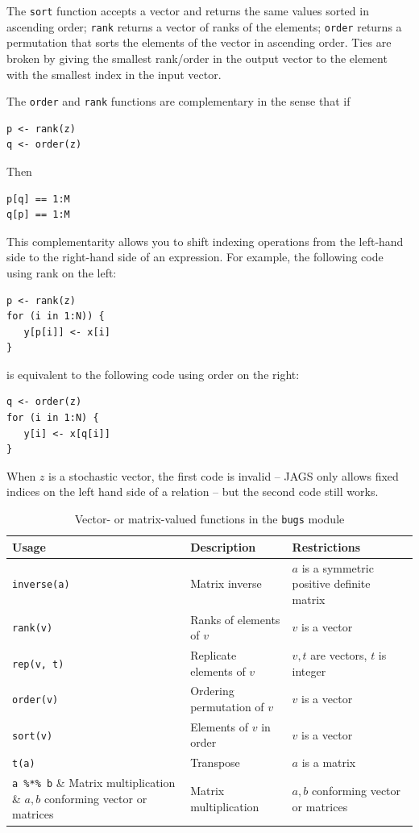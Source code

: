 \documentclass[11pt, a4paper, titlepage]{report}
\begin{document}
The  \texttt{sort} function accepts a vector and returns the
same values sorted in ascending order; \texttt{rank} returns a vector
of ranks of the elements; \texttt{order} returns a permutation that
sorts the elements of the vector in ascending order.  Ties are broken
by giving the smallest rank/order in the output vector to the element
with the smallest index in the input vector.



The \texttt{order} and \texttt{rank} functions are complementary
in the sense that if
\begin{verbatim}
p <- rank(z)
q <- order(z)
\end{verbatim}
Then
\begin{verbatim}
p[q] == 1:M
q[p] == 1:M
\end{verbatim}
This complementarity allows you to shift indexing operations from the
left-hand side to the right-hand side of an expression. For example,
the following code using rank on the left:
\begin{verbatim}
p <- rank(z)
for (i in 1:N)) {
   y[p[i]] <- x[i]
}
\end{verbatim}
is equivalent to the following code using order on the right:
\begin{verbatim}
q <- order(z)
for (i in 1:N) {
   y[i] <- x[q[i]]
}
\end{verbatim}
When $z$ is a stochastic vector, the first code is invalid -- JAGS
only allows fixed indices on the left hand side of a relation -- but
the second code still works.


\begin{table}
\begin{center}
\begin{tabular}{lll}
\hline
Usage & Description & Restrictions \\
\hline
\verb+inverse(a)+ & Matrix inverse & $a$ is a symmetric positive definite matrix  \\
\verb+rank(v)+ & Ranks of elements of $v$ & $v$ is a vector   \\
\verb+rep(v, t)+ & Replicate elements of $v$ & $v,t$ are vectors, $t$ is integer\\
\verb+order(v)+ & Ordering permutation of $v$ & $v$ is a vector \\
\verb+sort(v)+ & Elements of $v$ in order & $v$ is a vector  \\
\verb+t(a)+    & Transpose                & $a$ is a matrix \\
\verb+a %*% b+  & Matrix multiplication & $a,b$ conforming vector or matrices\\

\hline
\end{tabular}
\caption{Vector- or matrix-valued functions in the \texttt{bugs}
  module \label{table:bugs:vector}}
\end{center}
\end{table}
\end{document}
